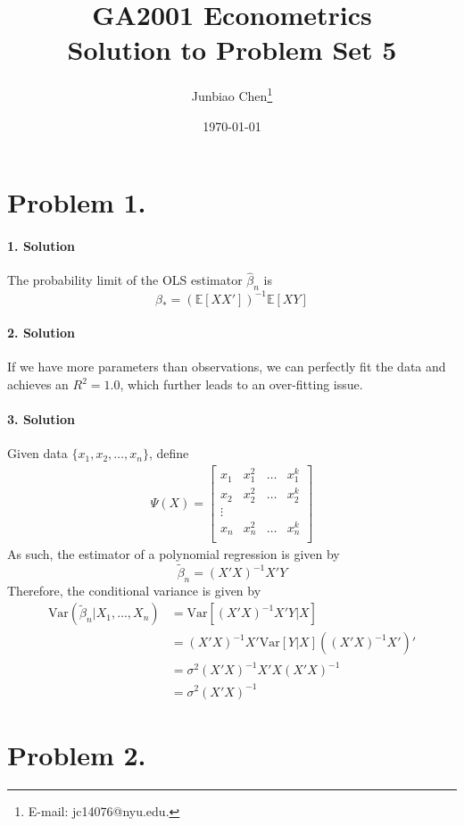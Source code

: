 \documentclass[11pt]{article}
\title{GA2001 Econometrics \\Solution to Problem Set 5}
\author{
Junbiao Chen\thanks{E-mail: jc14076@nyu.edu.}
}
\date{\today}
\theoremstyle{definition}
\theoremstyle{boldtitle} %
\numberwithin{equation}{section}
\numberwithin{figure}{section}
\numberwithin{table}{section}
\begin{document}
\maketitle
\section*{Problem 1.}
\paragraph{1. Solution}
The probability limit of the OLS estimator $\hat{\beta}_n$ is 
\[
\beta_* = \left(\mathbb{E}[XX']\right)^{-1}\mathbb{E}[XY]
\]

\paragraph{2. Solution}
If we have more parameters than observations,
we can perfectly fit the data and achieves an $R^2=1.0$,
which further leads to an over-fitting issue.

\paragraph{3. Solution}
Given data $\{x_1, x_2, \dots, x_n \}$,
define 
\begin{align*}
\Psi(X) = \begin{bmatrix}
    x_1 & x_1^2 & \dots & x_1^k \\ 
    x_2 & x_2^2 & \dots & x_2^k \\ 
    \vdots \\
    x_n & x_n^2 & \dots & x_n^k \\ 
\end{bmatrix}
\end{align*}
As such, the estimator of a polynomial regression is given by 
\[
\tilde{\beta}_n = \left( X'X\right)^{-1}X'Y
\]
Therefore, the conditional variance is given by 
\begin{align*}
\text{Var}\left(\tilde{\beta}_n |X_1, \dots, X_n \right) & = \text{Var}[\left( X'X\right)^{-1}X'Y|X] \\ 
 & = \left( X'X\right)^{-1}X' \text{Var}[Y|X] (\left( X'X\right)^{-1}X')' \\ 
 & = \sigma^2  \left( X'X\right)^{-1}X'X \left( X'X\right)^{-1} \\
 & = \sigma^2  \left( X'X\right)^{-1}
\end{align*}

\section*{Problem 2.}
\end{document}
